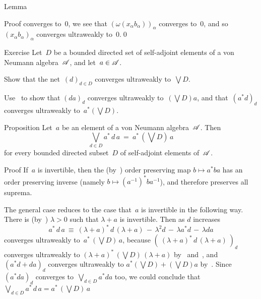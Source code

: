 \documentclass[a]{subfiles}
\begin{document}
\begin{parsec}
\begin{point}{Lemma}
\begin{point}{Proof}
converges to~$0$,
we see that $(\omega(x_\alpha b_\alpha))_\alpha$
converges to~$0$,
and so $(x_\alpha b_\alpha)_\alpha$ converges ultraweakly to~$0$.\qed
\end{point}
\end{point}
\begin{point}{Exercise}%
Let~$D$ be a bounded directed set of self-adjoint
elements of a von Neumann algebra~$\mathscr{A}$,
and let~$a\in \mathscr{A}$.
\begin{point}%
Show that the net~$(d)_{d\in D}$ converges ultraweakly to~$\bigvee D$.
\end{point}
\begin{point}%
Use~
to show that $(da)_d$ converges ultraweakly to~$(\bigvee D)a$,
and that~$(a^*d)_d$ converges ultraweakly to~$a^* (\bigvee D)$.
\end{point}
\end{point}
%
%
\begin{point}[ad-normal]{Proposition}%
Let~$a$ be an element of a von Neumann algebra~$\mathscr{A}$.
Then
\begin{equation*}
	\textstyle
	\bigvee_{d\in D} a^*\,d\,a \ =\  a^*\,(\bigvee D)\, a
\end{equation*}
for every bounded directed subset~$D$ of self-adjoint
elements of~$\mathscr{A}$.
\begin{point}[ad-normal-1]{Proof}%
If~$a$ is invertible,
then the (by~) order preserving map $b\mapsto a^*ba$
has an order preserving inverse (namely $b\mapsto (a^{-1})^* b a^{-1}$),
and therefore preserves all suprema.
\begin{point}%
The general case reduces to the case that~$a$ 
is invertible
in the following way.
There is (by~)
 $\lambda>0$ such that $\lambda+a$ is invertible.
Then as $d$ increases 
\begin{equation*}
a^*\,d\,a \ \equiv\  (\lambda+a)^*\,d\,(\lambda+a) \,-\,
 \lambda^2d \,-\, \lambda a^*d \,-\, \lambda da
\end{equation*}
converges ultraweakly
to~$a^* \,(\bigvee D)\,a$,
because $(\ (\lambda+a)^*\,d\,(\lambda+a)\ )_d$
converges ultraweakly to $(\lambda+a)^*\,(\bigvee D)\,(\lambda+a)$
by~ and~,
and $(a^*d+da)_d$ converges ultraweakly to $a^*(\bigvee D)+(\bigvee D)a$
by~.
Since~$(a^*da)_d$ converges to~$\bigvee_{d\in D} a^*d a$ too,
we could conclude that
$\bigvee_{d\in D} a^* \,d\, a = a^*\,(\bigvee D)\,a$

\end{point}
\end{point}
\end{point}
\end{parsec}
\end{document}
